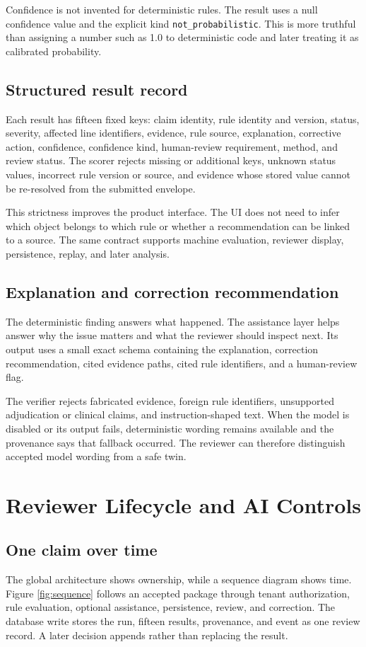 \documentclass[11pt,a4paper,oneside]{report}
\begin{document}
Confidence is not invented for deterministic rules. The result uses a null confidence value and the explicit kind \texttt{not\_probabilistic}. This is more truthful than assigning a number such as 1.0 to deterministic code and later treating it as calibrated probability.

\section{Structured result record}
Each result has fifteen fixed keys: claim identity, rule identity and version, status, severity, affected line identifiers, evidence, rule source, explanation, corrective action, confidence, confidence kind, human-review requirement, method, and review status. The scorer rejects missing or additional keys, unknown status values, incorrect rule version or source, and evidence whose stored value cannot be re-resolved from the submitted envelope.

This strictness improves the product interface. The UI does not need to infer which object belongs to which rule or whether a recommendation can be linked to a source. The same contract supports machine evaluation, reviewer display, persistence, replay, and later analysis.

\section{Explanation and correction recommendation}
The deterministic finding answers what happened. The assistance layer helps answer why the issue matters and what the reviewer should inspect next. Its output uses a small exact schema containing the explanation, correction recommendation, cited evidence paths, cited rule identifiers, and a human-review flag.

The verifier rejects fabricated evidence, foreign rule identifiers, unsupported adjudication or clinical claims, and instruction-shaped text. When the model is disabled or its output fails, deterministic wording remains available and the provenance says that fallback occurred. The reviewer can therefore distinguish accepted model wording from a safe twin.

\chapter{Reviewer Lifecycle and AI Controls}

\section{One claim over time}
The global architecture shows ownership, while a sequence diagram shows time. Figure \ref{fig:sequence} follows an accepted package through tenant authorization, rule evaluation, optional assistance, persistence, review, and correction. The database write stores the run, fifteen results, provenance, and event as one review record. A later decision appends rather than replacing the result.
\end{document}
